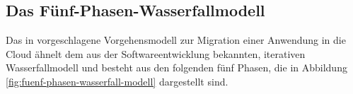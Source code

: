 \subsection{Das Fünf-Phasen-Wasserfallmodell}
\label{cha:five_phases}
Das in  vorgeschlagene Vorgehensmodell zur Migration
einer Anwendung in die Cloud ähnelt dem aus der
Softwareentwicklung bekannten, iterativen Wasserfallmodell und besteht aus den
folgenden fünf Phasen, die in Abbildung
\ref{fig:fuenf-phasen-wasserfall-modell}
dargestellt sind.

